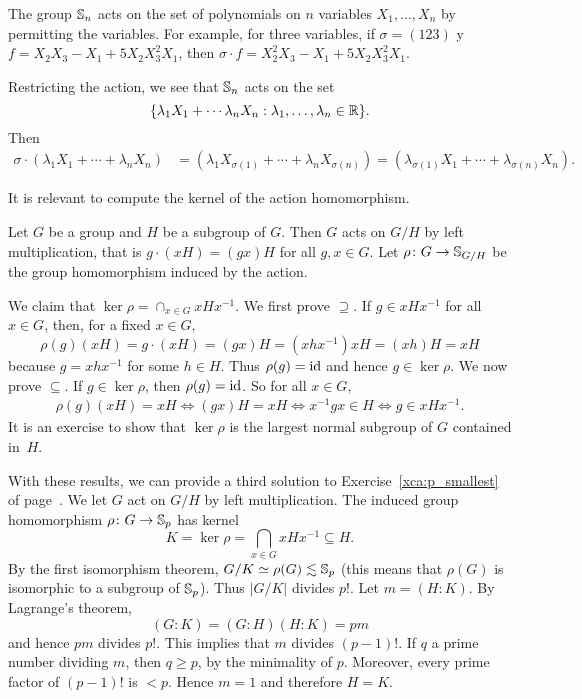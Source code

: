 \begin{example}
    The group $\mathbb{S}_n$ acts on the set of polynomials on
    $n$ variables $X_1,\dots,X_n$
    by permitting the variables. For example, for three variables, if 
    $\sigma=(123)$ y $f=X_2X_3-X_1+5X_2X_3^2X_1$, then 
    $\sigma\cdot f=X_2^2X_3-X_1+5X_2X_3^2X_1$.

    Restricting the action, we see that 
    $\mathbb{S}_n$ acts on the set 
    \[
    \{\lambda_1X_1+\cdots\lambda_nX_n:\lambda_1,\dots,\lambda_n\in\mathbb{R}\}.
    \]
    Then 
    \begin{align*}
    \sigma \cdot (\lambda_1X_1+\cdots+\lambda_nX_n) &= (\lambda_1X_{\sigma(1)}+\cdots+\lambda_nX_{\sigma(n)})
    =(\lambda_{\sigma(1)}X_1+\cdots+\lambda_{\sigma(n)}X_n).
    \end{align*}
\end{example}

It is relevant to compute the kernel of the action homomorphism. 

\begin{example}
Let $G$ be a group and $H$ be a subgroup of $G$. Then $G$ 
acts on $G/H$ by left multiplication, that is 
$g\cdot (xH)=(gx)H$ for all $g,x\in G$. Let $\rho\colon G\to\mathbb{S}_{G/H}$ be the group homomorphism induced by the action. 

We claim that $\ker\rho=\cap_{x\in G}xHx^{-1}$. 
We first prove $\supseteq$. If $g\in xHx^{-1}$ for all 
$x\in G$, then, for a fixed $x\in G$,
 \[
 \rho(g)(xH)=g\cdot (xH)=(gx)H=(xhx^{-1})xH=(xh)H=xH
 \]
because $g=xhx^{-1}$ for some $h\in H$. Thus $\rho(g)=\operatorname{id}$ 
and hence $g\in\ker\rho$. We now prove 
$\subseteq$. If $g\in\ker\rho$, then
 $\rho(g)=\operatorname{id}$. So for all $x\in G$,
 \begin{align*}
\rho(g)(xH)=xH
\Longleftrightarrow (gx)H=xH
\Longleftrightarrow x^{-1}gx\in H
\Longleftrightarrow g\in xHx^{-1}.
 \end{align*}
It is an exercise to show that
$\ker\rho$ is the largest normal subgroup of $G$ 
contained in~$H$.
\end{example}

With these results, we can provide a third 
solution to Exercise~\ref{xca:p_smallest} of 
page~\pageref{xca:p_smallest}.
We let  $G$ act on $G/H$ by left multiplication. 
The induced group homomorphism  $\rho\colon G\to\mathbb{S}_p$ has 
kernel 
\[
K=\ker\rho=\bigcap_{x\in G}xHx^{-1}\subseteq H.
\]
By the first isomorphism theorem, 
$G/K\simeq\rho(G)\lesssim\mathbb{S}_p$ (this means that 
$\rho(G)$ is isomorphic to a subgroup of $\mathbb{S}_p$). 
Thus $|G/K|$ divides $p!$.
Let $m=(H:K)$. By Lagrange's theorem,
\[
(G:K)=(G:H)(H:K)=pm
\]
and hence $pm$ divides $p!$. This implies that $m$ divides $(p-1)!$. If $q$ a prime number dividing 
 $m$, then $q\geq p$, by the minimality of $p$. Moreover, 
 every prime factor of $(p-1)!$ is 
 $<p$. Hence $m=1$ and therefore $H=K$.

